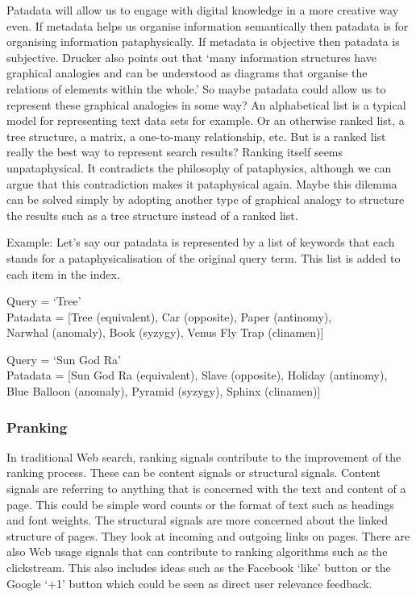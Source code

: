Patadata will allow us to engage with digital knowledge in a more creative way even. If metadata helps us organise information semantically then patadata is for organising information pataphysically. If metadata is objective then patadata is subjective. Drucker also points out that `many information structures have graphical analogies and can be understood as diagrams that organise the relations of elements within the whole.' \autocite[p.16]{Drucker2009} So maybe patadata could allow us to represent these graphical analogies in some way? An alphabetical list is a typical model for representing text data sets for example. Or an otherwise ranked list, a tree structure, a matrix, a one-to-many relationship, etc. But is a ranked list really the best way to represent search results? Ranking itself seems unpataphysical. It contradicts the philosophy of pataphysics, although we can argue that this contradiction makes it pataphysical again. Maybe this dilemma can be solved simply by adopting another type of graphical analogy to structure the results such as a tree structure instead of a ranked list.

Example: Let's say our patadata is represented by a list of keywords that each stands for a pataphysicalisation of the original query term. This list is added to each item in the index.

Query      = `Tree'\\
Patadata = [Tree (equivalent),  Car (opposite), Paper (antinomy),\\ Narwhal (anomaly), Book (syzygy), Venus Fly Trap (clinamen)]

Query      = `Sun God Ra'\\
Patadata = [Sun God Ra (equivalent), Slave (opposite), Holiday (antinomy),\\ Blue Balloon (anomaly), Pyramid (syzygy), Sphinx (clinamen)]


\subsubsection{Pranking}

In traditional Web search, ranking signals contribute to the improvement of the ranking process. These can be content signals or structural signals. Content signals are referring to anything that is concerned with the text and content of a page. This could be simple word counts or the format of text such as headings and font weights. The structural signals are more concerned about the linked structure of pages. They look at incoming and outgoing links on pages. There are also Web usage signals that can contribute to ranking algorithms such as the clickstream. This also includes ideas such as the Facebook `like' button or the Google `+1' button which could be seen as direct user relevance feedback.

